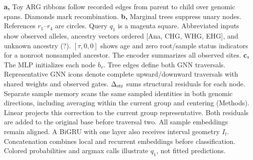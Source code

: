 \textbf{a,} Toy ARG ribbons follow recorded edges from parent to child over genomic spans. Diamonds mark recombination.
\textbf{b,} Marginal trees suppress unary nodes. References $r_1$--$r_4$ are circles. Query $q_1$ is a magenta square. Abbreviated inputs show observed alleles, ancestry vectors ordered [Ana, CHG, WHG, EHG], and unknown ancestry (?). $[\tau,0,0]$ shows age and zero root/sample status indicators for a nonroot nonsampled ancestor. The encoder summarizes all observed sites.
\textbf{c,} The MLP initializes each node $b_v$. Tree edges define both GNN traversals. Representative GNN icons denote complete upward/downward traversals with shared weights and observed gates. $\Delta_{\rm str}$ sums structural residuals for each node. Separate sample memory scans the same sampled identities in both genomic directions, including averaging within the current group and centering (Methods). Linear projects this correction to the current group representative. Both residuals are added to the original base before traversal two. All sample embeddings remain aligned. A BiGRU with one layer also receives interval geometry $I_t$. Concatenation combines local and recurrent embeddings before classification. Colored probabilities and argmax calls illustrate $q_1$, not fitted predictions.
